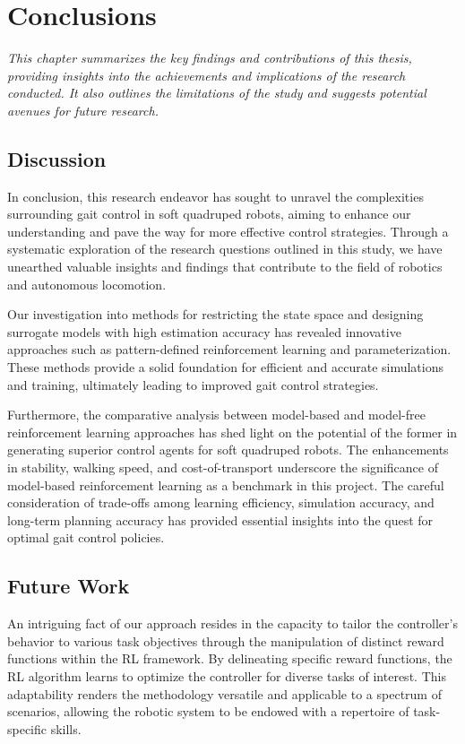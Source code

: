 \chapter{Conclusions}
\label{chap6}
\textit{This chapter summarizes the key findings and contributions of this thesis, providing insights into the achievements and implications of the research conducted. It also outlines the limitations of the study and suggests potential avenues for future research.}

\section{Discussion}
In conclusion, this research endeavor has sought to unravel the complexities surrounding gait control in soft quadruped robots, aiming to enhance our understanding and pave the way for more effective control strategies. Through a systematic exploration of the research questions outlined in this study, we have unearthed valuable insights and findings that contribute to the field of robotics and autonomous locomotion.

Our investigation into methods for restricting the state space and designing surrogate models with high estimation accuracy has revealed innovative approaches such as pattern-defined reinforcement learning and parameterization. These methods provide a solid foundation for efficient and accurate simulations and training, ultimately leading to improved gait control strategies.

Furthermore, the comparative analysis between model-based and model-free reinforcement learning approaches has shed light on the potential of the former in generating superior control agents for soft quadruped robots. The enhancements in stability, walking speed, and cost-of-transport underscore the significance of model-based reinforcement learning as a benchmark in this project. The careful consideration of trade-offs among learning efficiency, simulation accuracy, and long-term planning accuracy has provided essential insights into the quest for optimal gait control policies.

\section{Future Work}

An intriguing fact of our approach resides in the capacity to tailor the controller's behavior to various task objectives through the manipulation of distinct reward functions within the RL framework. By delineating specific reward functions, the RL algorithm learns to optimize the controller for diverse tasks of interest. This adaptability renders the methodology versatile and applicable to a spectrum of scenarios, allowing the robotic system to be endowed with a repertoire of task-specific skills.

